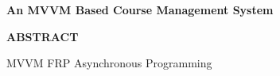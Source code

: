 \begin{center}
\textbf{An MVVM Based Course Management System}
\end{center}
\begin{center}
\textbf{ABSTRACT}
\end{center}
\vspace{2mm}

\vspace{3mm}
\quad MVVM \quad FRP \quad Asynchronous Programming
